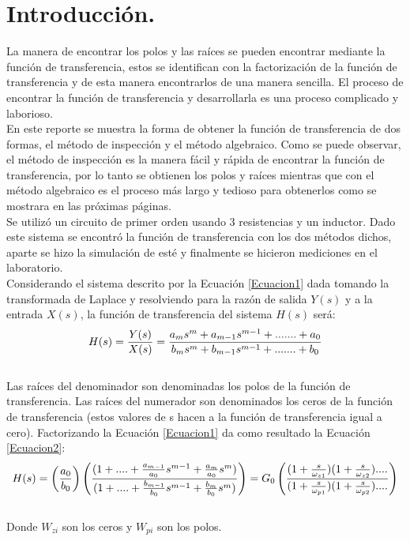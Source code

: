 \documentclass[12pt,a4paper]{article}
\newcounter{ns}
\begin{document}
\newpage
\section{Introducción.}
La manera de encontrar los polos y las raíces se pueden encontrar mediante la función de transferencia, estos se identifican con la factorización de la función de transferencia y de esta manera encontrarlos de una manera sencilla. El proceso de encontrar la función de transferencia y desarrollarla es una proceso complicado y laborioso.\\[12pt]
En este reporte se muestra la forma de obtener la función de transferencia de dos formas, el método de inspección y el método algebraico. Como se puede observar, el método de inspección es la manera fácil y rápida de encontrar la función de transferencia, por lo tanto se obtienen los polos y raíces mientras que con el método algebraico es el proceso  más largo y tedioso para obtenerlos como se mostrara en las próximas páginas.\\[12pt]
Se utilizó un circuito de primer orden usando 3 resistencias y un inductor. Dado este sistema se encontró la función de transferencia con los dos métodos dichos, aparte se hizo la simulación de esté y finalmente se hicieron mediciones en el laboratorio.\\[12pt]
Considerando el sistema descrito por la Ecuación \ref{Ecuacion1} dada tomando la transformada de Laplace y resolviendo para la razón de salida $Y(s)$ y a la entrada $X(s)$, la función de transferencia del sistema $H(s)$ será:\\
\begin{equation}
\centering
H(s) = \dfrac{Y(s)}{X(s)} = \dfrac{a_{m}s^{m}+a_{m-1}s^{m-1}+.......+a_{0}}{b_{m}s^{m}+b_{m-1}s^{m-1}+.......+b_{0}}
\label{Ecuacion1}
\end{equation}\\
Las raíces del denominador son denominadas los polos de la función de transferencia. Las raíces del numerador son denominados los ceros de la función de transferencia (estos valores de s hacen a la función de transferencia igual a cero). Factorizando la Ecuación \ref{Ecuacion1} da como resultado la Ecuación \ref{Ecuacion2}:\\
\begin{equation}
\centering
H(s) = \left(\dfrac{a_{0}}{b_{0}}\right)\left(\dfrac{(1+....+\frac{a_{m-1}}{a_{0}}s^{m-1} + \frac{a_{m}}{a_{0}}s^{m})}{(1+....+\frac{b_{m-1}}{b_{0}}s^{m-1} + \frac{b_{m}}{b_{0}}s^{m})}\right) = G_{0}\left(\dfrac{(1+\frac{s}{\omega_{z1}})(1+\frac{s}{\omega_{z2}})....}{(1+\frac{s}{\omega_{p1}})(1+\frac{s}{\omega_{p2}})....}\right)
\label{Ecuacion2}
\end{equation}\\
Donde $W_{zi}$ son los ceros y $W_{pi}$ son los polos.
\end{document}
